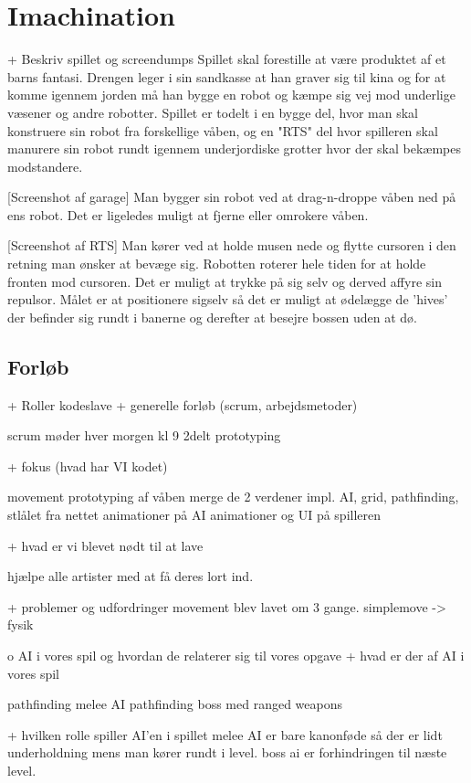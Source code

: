 



\section{Imachination}
                + Beskriv spillet og screendumps
Spillet skal forestille at være produktet af et barns fantasi. Drengen leger i sin sandkasse at han graver sig til kina og for at komme igennem jorden må han bygge en robot og kæmpe sig vej mod underlige væsener og andre robotter.
Spillet er todelt i en bygge del, hvor man skal konstruere sin robot fra forskellige våben, og en "RTS" del hvor spilleren skal manurere sin robot rundt igennem underjordiske grotter hvor der skal bekæmpes modstandere.

[Screenshot af garage]
Man bygger sin robot ved at drag-n-droppe våben ned på ens robot. Det er ligeledes muligt at fjerne eller omrokere våben.

[Screenshot af RTS]
Man kører ved at holde musen nede og flytte cursoren i den retning man ønsker at bevæge sig. Robotten roterer hele tiden for at holde fronten mod cursoren. Det er muligt at trykke på sig selv og derved affyre sin repulsor. Målet er at positionere sigselv så det er muligt at ødelægge de 'hives' der befinder sig rundt i banerne og derefter at besejre bossen uden at dø.

\subsection{Forløb}
                + Roller
kodeslave
                + generelle forløb (scrum, arbejdsmetoder)

scrum møder hver morgen kl 9
2delt prototyping

                + fokus (hvad har VI kodet)

movement
prototyping af våben
merge de 2 verdener
impl. AI, grid, pathfinding, stlålet fra nettet
animationer på AI
animationer og UI på spilleren


                + hvad er vi blevet nødt til at lave

hjælpe alle artister med at få deres lort ind.

                + problemer og udfordringer
movement blev lavet om 3 gange.
simplemove -> fysik

          o AI i vores spil og hvordan de relaterer sig til vores opgave
                + hvad er der af AI i vores spil

pathfinding melee AI
pathfinding boss med ranged weapons

                + hvilken rolle spiller AI’en i spillet
melee AI er bare kanonføde så der er lidt underholdning mens man kører rundt i level.
boss ai er forhindringen til næste level.
